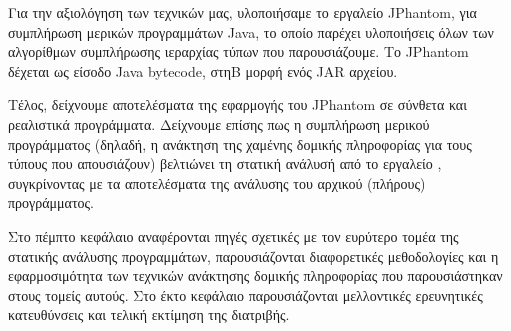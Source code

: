 Για την αξιολόγηση των τεχνικών μας, υλοποιήσαμε το εργαλείο {\en
  JPhantom}, για συμπλήρωση μερικών προγραμμάτων {\en Java}, το οποίο
παρέχει υλοποιήσεις όλων των αλγορίθμων συμπλήρωσης ιεραρχίας τύπων
που παρουσιάζουμε. Το {\en JPhantom} δέχεται ως είσοδο {\en Java
  bytecode}, στηΒ μορφή ενός {\en JAR} αρχείου.

Τέλος, δείχνουμε αποτελέσματα της εφαρμογής του {\en JPhantom} σε
σύνθετα και ρεαλιστικά προγράμματα. Δείχνουμε επίσης πως η συμπλήρωση
μερικού προγράμματος (δηλαδή, η ανάκτηση της χαμένης δομικής
πληροφορίας για τους τύπους που απουσιάζουν) βελτιώνει τη στατική
ανάλυσή από το εργαλείο {\en \doop{}}, συγκρίνοντας με τα αποτελέσματα
της ανάλυσης του αρχικού (πλήρους) προγράμματος.



Στο πέμπτο κεφάλαιο αναφέρονται πηγές σχετικές με τον ευρύτερο τομέα
της στατικής ανάλυσης προγραμμάτων, παρουσιάζονται διαφορετικές
μεθοδολογίες και η εφαρμοσιμότητα των τεχνικών ανάκτησης δομικής
πληροφορίας που παρουσιάστηκαν στους τομείς αυτούς. Στο έκτο κεφάλαιο
παρουσιάζονται μελλοντικές ερευνητικές κατευθύνσεις και τελική
εκτίμηση της διατριβής.


